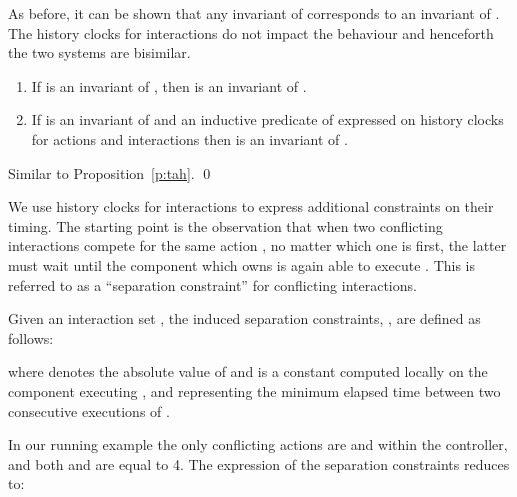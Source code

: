 \documentclass{LMCS}
\theoremstyle{plain}\newtheorem{remark}[thm]{Remark}
\theoremstyle{plain}\newtheorem{example}[thm]{Example}
\begin{document}
As before, it can be shown that any invariant of  corresponds
to an invariant of .  The history clocks for interactions
do not impact the behaviour and henceforth the two systems are bisimilar.

\begin{prop} \label{p:dtah} \hfill
  \begin{enumerate}
  \item If  is an invariant of , then  is an invariant of .
  \item If  is an invariant of  and  an inductive predicate of 
 expressed on history clocks for actions and interactions  then  is an invariant of .
 \end{enumerate}
\end{prop}
\proof Similar to Proposition~\ref{p:tah}.
\qed

We use history clocks for interactions to express additional constraints on
their timing. The starting point is the observation that when two
conflicting interactions compete for the same action , no matter which
one is first, the latter must wait until the component which owns  is
again able to execute . This is referred to as a ``separation
constraint'' for conflicting interactions.

\begin{defi}
\label{def:sep}
Given an interaction set , the induced separation constraints,
, are defined as follows:
 
where  denotes the absolute value of  and  is a
constant computed locally on the component executing , and representing
the minimum elapsed time between two consecutive executions of .
\end{defi}

In our running example the only conflicting actions are  and  within
the controller, and both  and  are equal to 4. The
expression of the separation constraints reduces to:
\end{document}
